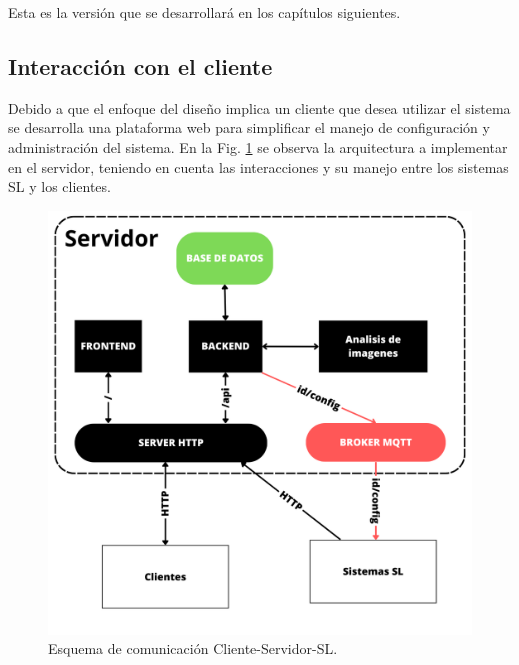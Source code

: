Esta es la versión que se desarrollará en los capítulos siguientes.

\subsection{Interacción con el cliente}

Debido a que el enfoque del diseño implica un cliente que desea utilizar el sistema se desarrolla una plataforma web para simplificar el manejo de configuración y administración del sistema. En la Fig. \ref{fig:esquema-cliente-servidor-sl} se observa la arquitectura a implementar en el servidor, teniendo en cuenta las interacciones y su manejo entre los sistemas SL y los clientes.
\begin{figure}[bth]
    \centering
    \includegraphics[width=.6\textwidth]{imgs/server-clientes-barreras.png}
    \caption{Esquema de comunicación Cliente-Servidor-SL.}
    \label{fig:esquema-cliente-servidor-sl}
\end{figure}

